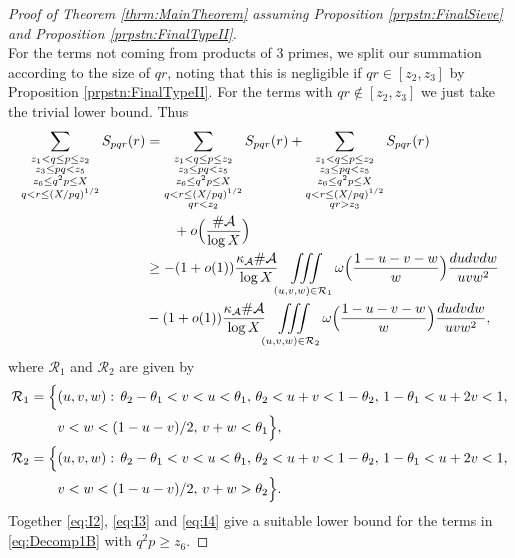 \documentclass[10pt]{amsart}
\theoremstyle{plain}
\numberwithin{sblmm}{thrm}
\numberwithin{equation}{section}
\begin{document}
\begin{proof}[Proof of Theorem \ref{thrm:MainTheorem} assuming Proposition \ref{prpstn:FinalSieve} and Proposition \ref{prpstn:FinalTypeII}]
\begin{equation}
\end{equation}
%
For the terms not coming from products of 3 primes, we split our summation according to the size of $qr$, noting that this is negligible if $qr\in[z_2,z_3]$ by Proposition \ref{prpstn:FinalTypeII}. For the terms with $qr\notin [z_2,z_3]$ we just take the trivial lower bound. Thus
%
\begin{align}
\sum_{\substack{z_1<q\le p\le z_2 \\ z_3\le p q<z_5\\ z_6\le q^2 p\le X\\ q<r\le (X/p q)^{1/2}}}S_{p q r}(r)&=\sum_{\substack{z_1<q\le p\le z_2 \\ z_3\le p q<z_5\\ z_6\le q^2 p\le X\\ q<r\le (X/p q)^{1/2}\\ qr<z_2}}S_{p q r}(r)+\sum_{\substack{z_1<q\le p\le z_2\\  z_3\le p q<z_5\\ z_6\le q^2 p\le X\\ q<r\le (X/p q)^{1/2}\\ qr>z_3}}S_{p q r}(r)\nonumber\\
&\qquad+o\Bigl(\frac{\#\mathcal{A}{}}{\log{X}}\Bigr)\nonumber\\
&\ge-(1+o(1))\frac{\kappa_{\mathcal{A}}\#\mathcal{A}{}}{\log{X}}
 \iiint\limits_{(u,v,w)\in\mathcal{R}_1}\omega\Bigl(\frac{1-u-v-w}{w}\Bigr)\frac{d u d v d w}{u v w^2}\label{eq:I3}\\
 &-(1+o(1))\frac{\kappa_{\mathcal{A}}\#\mathcal{A}{}}{\log{X}} \iiint\limits_{(u,v,w)\in\mathcal{R}_2}\omega\Bigl(\frac{1-u-v-w}{w}\Bigr)\frac{d u d v d w}{u v w^2},\label{eq:I4}
\end{align}
%
where $\mathcal{R}_1$ and $\mathcal{R}_2$ are given by
%
\begingroup
\allowdisplaybreaks
\begin{align*}
\mathcal{R}_1&=\Bigl\{(u,v,w):\,\theta_2-\theta_1<v<u<\theta_1,\,\theta_2<u+v<1-\theta_2,\,1-\theta_1<u+2v<1,\\
&\qquad v<w<(1-u-v)/2,\,v+w<\theta_1\Bigr\},\\
\mathcal{R}_2&=\Bigl\{(u,v,w):\,\theta_2-\theta_1<v<u<\theta_1,\,\theta_2<u+v<1-\theta_2,\,1-\theta_1<u+2v<1,\\
&\qquad v<w<(1-u-v)/2,\,v+w>\theta_2\Bigr\}.
\end{align*}
\endgroup
%
Together \eqref{eq:I2}, \eqref{eq:I3} and \eqref{eq:I4} give a suitable lower bound for the terms in \eqref{eq:Decomp1B} with $q^2p\ge z_6$.


\end{proof}
\end{document}
